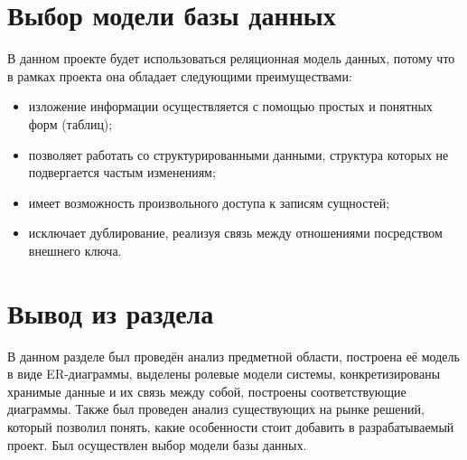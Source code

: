 \section{Выбор модели базы данных}

В данном проекте будет использоваться реляционная модель данных, потому что в рамках проекта она обладает следующими преимуществами:
 
\begin{itemize}
	\item изложение информации осуществляется с помощью простых и понятных форм (таблиц);
	\item позволяет работать со структурированными данными, структура которых не подвергается частым изменениям;
	\item имеет возможность произвольного доступа к записям сущностей;
	\item исключает дублирование, реализуя связь между отношениями посредством внешнего ключа.
\end{itemize}

\section{Вывод из раздела}

В данном разделе был проведён анализ предметной области, построена её модель в виде ER-диаграммы, выделены ролевые модели системы, конкретизированы хранимые данные и их связь между собой, построены соответствующие диаграммы. Также был проведен анализ существующих на рынке решений, который позволил понять, какие особенности стоит добавить в разрабатываемый проект. Был осуществлен выбор модели базы данных.